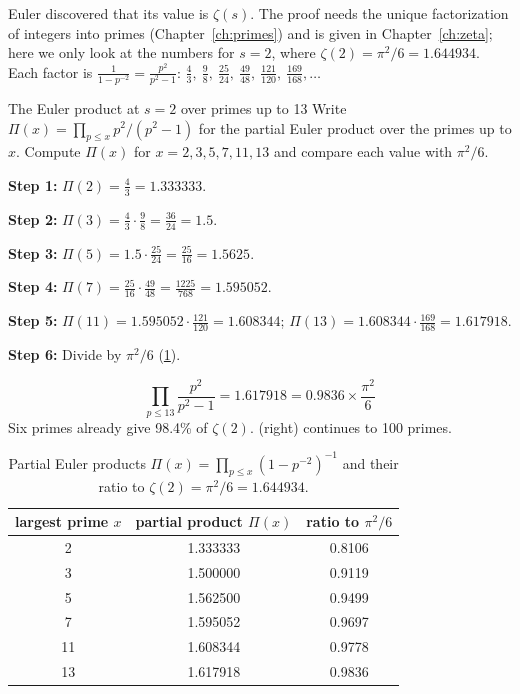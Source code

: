 Euler discovered that its value is $\zeta(s)$. The proof needs the unique factorization of integers into primes (Chapter~\ref{ch:primes}) and is given in Chapter~\ref{ch:zeta}; here we only look at the numbers for $s=2$, where $\zeta(2)=\pi^2/6=1.644934$. Each factor is $\frac1{1-p^{-2}}=\frac{p^2}{p^2-1}$: $\frac43,\ \frac98,\ \frac{25}{24},\ \frac{49}{48},\ \frac{121}{120},\ \frac{169}{168},\dots$

\begin{sample}{The Euler product at $s=2$ over primes up to 13}
Write $\Pi(x)=\prod_{p\le x}p^2/(p^2-1)$ for the partial Euler product over the primes up to $x$. Compute $\Pi(x)$ for $x=2,3,5,7,11,13$ and compare each value with $\pi^2/6$.

\textbf{Step 1:} $\Pi(2)=\frac43=1.333333$.

\textbf{Step 2:} $\Pi(3)=\frac43\cdot\frac98=\frac{36}{24}=1.5$.

\textbf{Step 3:} $\Pi(5)=1.5\cdot\frac{25}{24}=\frac{25}{16}=1.5625$.

\textbf{Step 4:} $\Pi(7)=\frac{25}{16}\cdot\frac{49}{48}=\frac{1225}{768}=1.595052$.

\textbf{Step 5:} $\Pi(11)=1.595052\cdot\frac{121}{120}=1.608344$; $\Pi(13)=1.608344\cdot\frac{169}{168}=1.617918$.

\textbf{Step 6:} Divide by $\pi^2/6$ (\cref{tab:series-euler}).

\[\boxed{\prod_{p\le13}\frac{p^2}{p^2-1}=1.617918=0.9836\times\frac{\pi^2}{6}}\]
Six primes already give 98.4\% of $\zeta(2)$.  (right) continues to 100 primes.
\end{sample}

\begin{table}[htbp]\centering
\caption{Partial Euler products $\Pi(x)=\prod_{p\le x}(1-p^{-2})^{-1}$ and their ratio to $\zeta(2)=\pi^2/6=1.644934$.}
\label{tab:series-euler}
\begin{tabular}{ccc}
\toprule
largest prime $x$ & partial product $\Pi(x)$ & ratio to $\pi^2/6$\\
\midrule
2 & 1.333333 & 0.8106\\
3 & 1.500000 & 0.9119\\
5 & 1.562500 & 0.9499\\
7 & 1.595052 & 0.9697\\
11 & 1.608344 & 0.9778\\
13 & 1.617918 & 0.9836\\
\bottomrule
\end{tabular}
\end{table}

